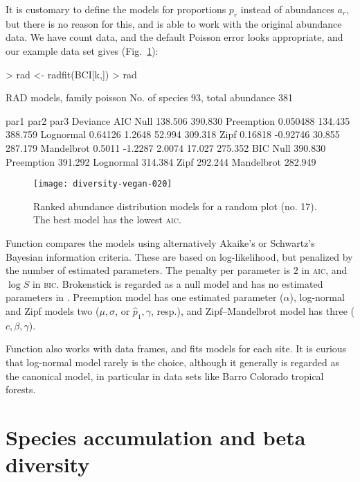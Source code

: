 \documentclass[a4paper,10pt,twocolumn]{article}
\begin{document}
It is customary to define the models for proportions $p_r$ instead of
abundances $a_r$, but there is no reason for this, and 
is able to work with the original abundance data.  We have count data,
and the default Poisson error looks appropriate, and our example data
set gives (Fig.~\ref{fig:rad}):
\begin{Schunk}
\begin{Sinput}
> rad <- radfit(BCI[k,])
> rad
\end{Sinput}
\begin{Soutput}
RAD models, family poisson 
No. of species 93, total abundance 381

           par1      par2     par3    Deviance AIC    
Null                                  138.506  390.830
Preemption  0.050488                  134.435  388.759
Lognormal   0.64126   1.2648           52.994  309.318
Zipf        0.16818  -0.92746          30.855  287.179
Mandelbrot  0.5011   -1.2287   2.0074  17.027  275.352
           BIC    
Null       390.830
Preemption 391.292
Lognormal  314.384
Zipf       292.244
Mandelbrot 282.949
\end{Soutput}
\end{Schunk}
\begin{figure}
\texttt{[image: diversity-vegan-020]}
\caption{Ranked abundance distribution models for a random plot
  (no. 17).  The best model has the lowest \textsc{aic}.}
\label{fig:rad}
\end{figure}

Function  compares the models using alternatively
Akaike's or Schwartz's Bayesian information criteria.  These are based
on log-likelihood, but penalized by the number of estimated
parameters.  The penalty per parameter is $2$ in \textsc{aic}, and
$\log S$ in \textsc{bic}.  Brokenstick is regarded as a null model and
has no estimated parameters in .  Preemption model has
one estimated parameter ($\alpha$), log-normal and Zipf models two
($\mu, \sigma$, or $\hat p_1, \gamma$, resp.), and Zipf--Mandelbrot
model has three ($c, \beta, \gamma$).

Function  also works with data frames, and fits models
for each site. It is curious that log-normal model rarely is the
choice, although it generally is regarded as the canonical model, in
particular in data sets like Barro Colorado tropical forests.

\section{Species accumulation and beta diversity}
\end{document}
